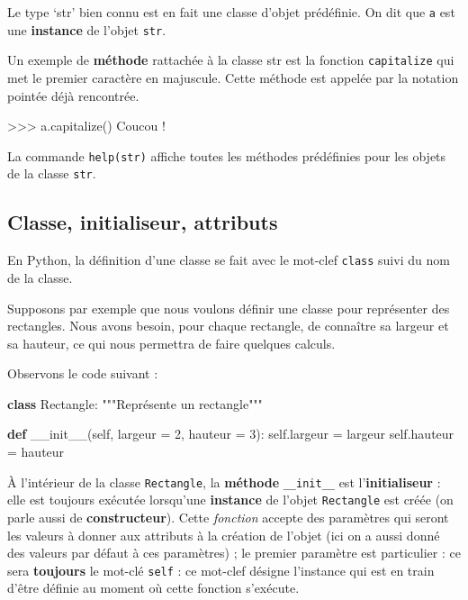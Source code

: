 \documentclass[
  french,
  letterpaper,
  DIV=11,
  numbers=noendperiod]{scrartcl}
\newenvironment{Shaded}{\begin{snugshade}}{\end{snugshade}}
\newcommand{\CommentTok}[1]{\textcolor[rgb]{0.37,0.37,0.37}{#1}}
\newcommand{\DecValTok}[1]{\textcolor[rgb]{0.68,0.00,0.00}{#1}}
\newcommand{\FunctionTok}[1]{\textcolor[rgb]{0.28,0.35,0.67}{#1}}
\newcommand{\KeywordTok}[1]{\textcolor[rgb]{0.00,0.23,0.31}{\textbf{#1}}}
\newcommand{\NormalTok}[1]{\textcolor[rgb]{0.00,0.23,0.31}{#1}}
\newcommand{\OperatorTok}[1]{\textcolor[rgb]{0.37,0.37,0.37}{#1}}
\newcommand{\VariableTok}[1]{\textcolor[rgb]{0.07,0.07,0.07}{#1}}
\begin{document}
Le type `str' bien connu est en fait une classe d'objet prédéfinie. On
dit que \texttt{a} est une \textbf{instance} de l'objet \texttt{str}.

Un exemple de \textbf{méthode} rattachée à la classe str est la fonction
\texttt{capitalize} qui met le premier caractère en majuscule. Cette
méthode est appelée par la notation pointée déjà rencontrée.

\begin{Shaded}
\begin{Highlighting}[]
\OperatorTok{\textgreater{}\textgreater{}\textgreater{}}\NormalTok{ a.capitalize()}
\CommentTok{\textquotesingle{}Coucou !\textquotesingle{}}
\end{Highlighting}
\end{Shaded}

La commande \texttt{help(str)} affiche toutes les méthodes prédéfinies
pour les objets de la classe \texttt{str}.

\subsection{Classe, initialiseur,
attributs}\label{classe-initialiseur-attributs}

En Python, la définition d'une classe se fait avec le mot-clef
\texttt{class} suivi du nom de la classe.

Supposons par exemple que nous voulons définir une classe pour
représenter des rectangles. Nous avons besoin, pour chaque rectangle, de
connaître sa largeur et sa hauteur, ce qui nous permettra de faire
quelques calculs.

Observons le code suivant :

\begin{Shaded}
\begin{Highlighting}[]
\KeywordTok{class}\NormalTok{ Rectangle:}
    \CommentTok{"""Représente un rectangle"""}
    
    \KeywordTok{def} \FunctionTok{\_\_init\_\_}\NormalTok{(}\VariableTok{self}\NormalTok{, largeur }\OperatorTok{=} \DecValTok{2}\NormalTok{, hauteur }\OperatorTok{=} \DecValTok{3}\NormalTok{):}
        \VariableTok{self}\NormalTok{.largeur }\OperatorTok{=}\NormalTok{ largeur}
        \VariableTok{self}\NormalTok{.hauteur }\OperatorTok{=}\NormalTok{ hauteur}
\end{Highlighting}
\end{Shaded}

À l'intérieur de la classe \texttt{Rectangle}, la \textbf{méthode}
\texttt{\_\_init\_\_} est l'\textbf{initialiseur} : elle est toujours
exécutée lorsqu'une \textbf{instance} de l'objet \texttt{Rectangle} est
créée (on parle aussi de \textbf{constructeur}). Cette \emph{fonction}
accepte des paramètres qui seront les valeurs à donner aux attributs à
la création de l'objet (ici on a aussi donné des valeurs par défaut à
ces paramètres) ; le premier paramètre est particulier : ce sera
\textbf{toujours} le mot-clé \texttt{self} : ce mot-clef désigne
l'instance qui est en train d'être définie au moment où cette fonction
s'exécute.
\end{document}
